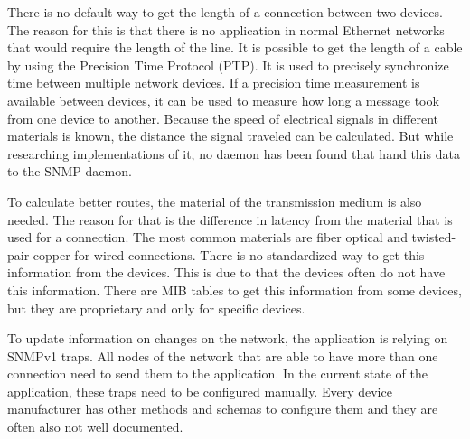 There is no default way to get the length of a connection between two devices. The reason for this is that there is no application in normal Ethernet networks that would require the length of the line. It is possible to get the length of a cable by using the Precision Time Protocol (PTP). It is used to precisely synchronize time between multiple network devices. If a precision time measurement is available between devices, it can be used to measure how long a message took from one device to another. Because the speed of electrical signals in different materials is known, the distance the signal traveled can be calculated. But while researching implementations of it, no daemon has been found that hand this data to the SNMP daemon.

To calculate better routes, the material of the transmission medium is also needed. The reason for that is the difference in latency from the material that is used for a connection. The most common materials are fiber optical and twisted-pair copper for wired connections. There is no standardized way to get this information from the devices. This is due to that the devices often do not have this information. There are MIB tables to get this information from some devices, but they are proprietary and only for specific devices.

To update information on changes on the network, the application is relying on SNMPv1 traps. All nodes of the network that are able to have more than one connection need to send them to the application. In the current state of the application, these traps need to be configured manually. Every device manufacturer has other methods and schemas to configure them and they are often also not well documented. 